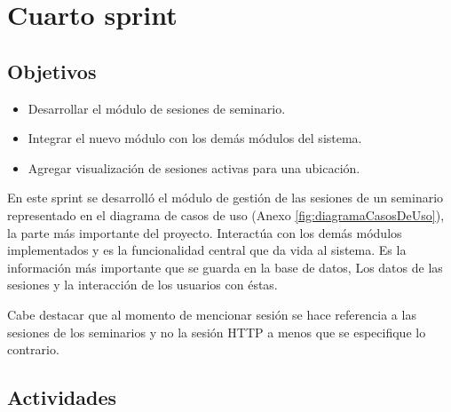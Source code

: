 \section{Cuarto sprint} %
\label{sec:cuarto_sprint}

\subsection{Objetivos}

\begin{itemize}
	\item Desarrollar el módulo de sesiones de seminario.
	\item Integrar el nuevo módulo con los demás módulos del sistema.
	\item Agregar visualización de sesiones activas para una ubicación.
\end{itemize}

En este sprint se desarrolló el módulo de gestión de las sesiones de un seminario representado en el diagrama de casos de uso (Anexo \ref{fig:diagramaCasosDeUso}), la parte más importante del proyecto. Interactúa con los demás módulos implementados y es la funcionalidad central que da vida al sistema. Es la información más importante que se guarda en la base de datos, Los datos de las sesiones y la interacción de los usuarios con éstas.

Cabe destacar que al momento de mencionar sesión se hace referencia a las sesiones de los seminarios y no la sesión \gls{HTTP} a menos que se especifique lo contrario.

\subsection{Actividades} %
\label{sub:actividades4}

